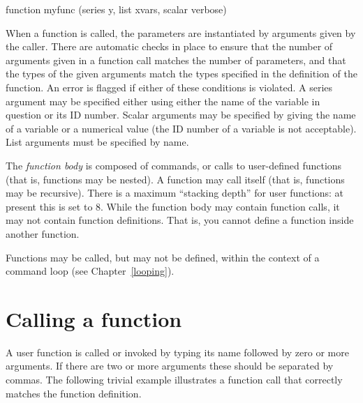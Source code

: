 \begin{code}
      function myfunc (series y, list xvars, scalar verbose)
\end{code}

When a function is called, the parameters are instantiated by
arguments given by the caller.  There are automatic checks in place to
ensure that the number of arguments given in a function call matches
the number of parameters, and that the types of the given arguments
match the types specified in the definition of the function.  An error
is flagged if either of these conditions is violated.  A series
argument may be specified either using either the name of the variable
in question or its ID number.  Scalar arguments may be specified by
giving the name of a variable or a numerical value (the ID number of a
variable is not acceptable).  List arguments must be specified by
name.
    
The \textsl{function body} is composed of  commands, or
calls to user-defined functions (that is, functions may be nested).  A
function may call itself (that is, functions may be recursive). There
is a maximum ``stacking depth'' for user functions: at present this is
set to 8.  While the function body may contain function calls, it may
not contain function definitions.  That is, you cannot define a
function inside another function.  

Functions may be called, but may not be defined, within the context of
a command loop (see Chapter~\ref{looping}).
    

\section{Calling a function}
\label{func-call}

A user function is called or invoked by typing its name followed by
zero or more arguments.  If there are two or more arguments these
should be separated by commas.  The following trivial example
illustrates a function call that correctly matches the function
definition.
    

